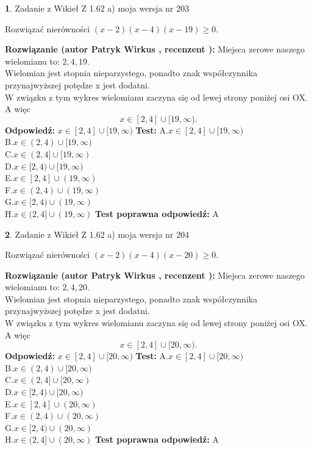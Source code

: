 \documentclass[12pt, a4paper]{article}
\theoremstyle{definition} %
\newtheorem{zad}{}
\newcommand{\zadStart}[1]{\begin{zad}#1\newline}
\newcommand{\zadStop}{\end{zad}}
\newcommand{\rozwStart}[2]{\noindent \textbf{Rozwiązanie (autor #1 , recenzent #2): }\newline}
\newcommand{\rozwStop}{\newline}
\newcommand{\odpStart}{\noindent \textbf{Odpowiedź:}\newline}
\newcommand{\odpStop}{\newline}
\newcommand{\testStart}{\noindent \textbf{Test:}\newline}
\newcommand{\testStop}{\newline}
\newcommand{\kluczStart}{\noindent \textbf{Test poprawna odpowiedź:}\newline}
\newcommand{\kluczStop}{\newline}
\begin{document}
\zadStart{Zadanie z Wikieł Z 1.62 a) moja wersja nr 203}

Rozwiązać nierówności $(x-2)(x-4)(x-19)\ge0$.
\zadStop
\rozwStart{Patryk Wirkus}{}
Miejsca zerowe naszego wielomianu to: $2, 4, 19$.\\
Wielomian jest stopnia nieparzystego, ponadto znak współczynnika przy\linebreak najwyższej potędze x jest dodatni.\\ W związku z tym wykres wielomianu zaczyna się od lewej strony poniżej osi OX. A więc $$x \in [2,4] \cup [19,\infty).$$
\rozwStop
\odpStart
$x \in [2,4] \cup [19,\infty)$
\odpStop
\testStart
A.$x \in [2,4] \cup [19,\infty)$\\
B.$x \in (2,4) \cup [19,\infty)$\\
C.$x \in (2,4] \cup [19,\infty)$\\
D.$x \in [2,4) \cup [19,\infty)$\\
E.$x \in [2,4] \cup (19,\infty)$\\
F.$x \in (2,4) \cup (19,\infty)$\\
G.$x \in [2,4) \cup (19,\infty)$\\
H.$x \in (2,4] \cup (19,\infty)$
\testStop
\kluczStart
A
\kluczStop



\zadStart{Zadanie z Wikieł Z 1.62 a) moja wersja nr 204}

Rozwiązać nierówności $(x-2)(x-4)(x-20)\ge0$.
\zadStop
\rozwStart{Patryk Wirkus}{}
Miejsca zerowe naszego wielomianu to: $2, 4, 20$.\\
Wielomian jest stopnia nieparzystego, ponadto znak współczynnika przy\linebreak najwyższej potędze x jest dodatni.\\ W związku z tym wykres wielomianu zaczyna się od lewej strony poniżej osi OX. A więc $$x \in [2,4] \cup [20,\infty).$$
\rozwStop
\odpStart
$x \in [2,4] \cup [20,\infty)$
\odpStop
\testStart
A.$x \in [2,4] \cup [20,\infty)$\\
B.$x \in (2,4) \cup [20,\infty)$\\
C.$x \in (2,4] \cup [20,\infty)$\\
D.$x \in [2,4) \cup [20,\infty)$\\
E.$x \in [2,4] \cup (20,\infty)$\\
F.$x \in (2,4) \cup (20,\infty)$\\
G.$x \in [2,4) \cup (20,\infty)$\\
H.$x \in (2,4] \cup (20,\infty)$
\testStop
\kluczStart
A
\kluczStop
\end{document}
